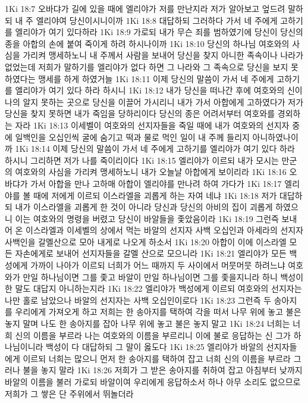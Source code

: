 1Ki 18:7  오바댜가 길에 있을 때에 엘리야가 저를 만난지라 저가 알아보고 엎드려 말하되 내 주 엘리야여 당신이시니이까
1Ki 18:8  대답하되 그러하다 가서 네 주에게 고하기를 엘리야가 여기 있다하라
1Ki 18:9  가로되 내가 무슨 죄를 범하였기에 당신이 당신의 종을 아합의 손에 붙여 죽이게 하려 하시나이까
1Ki 18:10  당신의 하나님 여호와의 사심을 가리켜 맹세하노니 내 주께서 사람을 보내어 당신을 찾지 아니한 족속이나 나라가 없었는데 저희가 말하기를 엘리야가 없다 하면 그 나라와 그 족속으로 당신을 보지 못하였다는 맹세를 하게 하였거늘
1Ki 18:11  이제 당신의 말씀이 가서 네 주에게 고하기를 엘리야가 여기 있다 하라 하시니
1Ki 18:12  내가 당신을 떠나간 후에 여호와의 신이 나의 알지 못하는 곳으로 당신을 이끌어 가시리니 내가 가서 아합에게 고하였다가 저가 당신을 찾지 못하면 내가 죽임을 당하리이다 당신의 종은 어려서부터 여호와를 경외하는 자라
1Ki 18:13  이세벨이 여호와의 선지자들을 죽일 때에 내가 여호와의 선지자 중에 일백인을 오십인씩 굴에 숨기고 떡과 물로 먹인 일이 내 주께 들리지 아니하였나이까
1Ki 18:14  이제 당신의 말씀이 가서 네 주에게 고하기를 엘리야가 여기 있다 하라 하시니 그리하면 저가 나를 죽이리이다
1Ki 18:15  엘리야가 이르되 내가 모시는 만군의 여호와의 사심을 가리켜 맹세하노니 내가 오늘날 아합에게 보이리라
1Ki 18:16  오바댜가 가서 아합을 만나 고하매 아합이 엘리야를 만나려 하여 가다가
1Ki 18:17  엘리야를 볼 때에 저에게 이르되 이스라엘을 괴롭게 하는 자여 네냐
1Ki 18:18  저가 대답하되 내가 이스라엘을 괴롭게 한 것이 아니라 당신과 당신의 아비의 집이 괴롭게 하였으니 이는 여호와의 명령을 버렸고 당신이 바알들을 좇았음이라
1Ki 18:19  그런즉 보내어 온 이스라엘과 이세벨의 상에서 먹는 바알의 선지자 사백 오십인과 아세라의 선지자 사백인을 갈멜산으로 모아 내게로 나오게 하소서
1Ki 18:20  아합이 이에 이스라엘 모든 자손에게로 보내어 선지자들을 갈멜 산으로 모으니라
1Ki 18:21  엘리야가 모든 백성에게 가까이 나아가 이르되 너희가 어느 때까지 두 사이에서 머뭇머뭇 하려느냐 여호와가 만일 하나님이면 그를 좇고 바알이 만일 하나님이면 그를 좇을지니라 하니 백성이 한 말도 대답지 아니하는지라
1Ki 18:22  엘리야가 백성에게 이르되 여호와의 선지자는 나만 홀로 남았으나 바알의 선지자는 사백 오십인이로다
1Ki 18:23  그런즉 두 송아지를 우리에게 가져오게 하고 저희는 한 송아지를 택하여 각을 떠서 나무 위에 놓고 불은 놓지 말며 나도 한 송아지를 잡아 나무 위에 놓고 불은 놓지 말고
1Ki 18:24  너희는 너희 신의 이름을 부르라 나는 여호와의 이름을 부르리니 이에 불로 응답하는 신 그가 하나님이니라 백성이 다 대답하되 그 말이 옳도다
1Ki 18:25  엘리야가 바알의 선지자들에게 이르되 너희는 많으니 먼저 한 송아지를 택하여 잡고 너희 신의 이름을 부르라 그러나 불을 놓지 말라
1Ki 18:26  저희가 그 받은 송아지를 취하여 잡고 아침부터 낮까지 바알의 이름을 불러 가로되 바알이여 우리에게 응답하소서 하나 아무 소리도 없으므로 저희가 그 쌓은 단 주위에서 뛰놀더라
